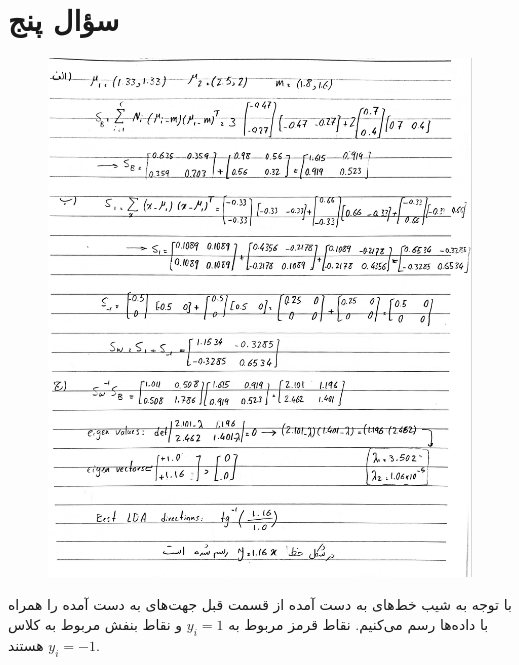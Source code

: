 \documentclass[12pt,onecolumn,a4paper]{article}
\begin{document}
\section*{سؤال پنج}
\begin{figure}[h!]
    \begin{center}
    \includegraphics[width=\linewidth]{hand_written/5.jpg}
    \end{center}
\end{figure}
با توجه به شیب خط‌های به دست آمده از قسمت قبل جهت‌های به دست آمده را همراه با داده‌ها رسم می‌کنیم. نقاط قرمز مربوط به $y_{i} = 1$ و نقاط بنفش مربوط به کلاس $y_{i}=-1$ هستند.
\end{document}
